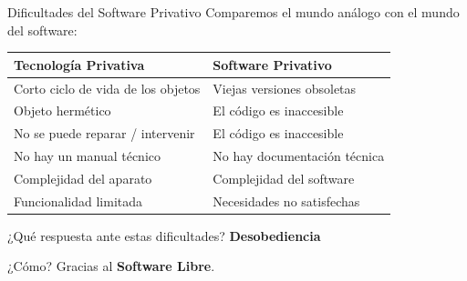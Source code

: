 \documentclass[spanish]{beamer}
\begin{document}
\begin{frame}{Dificultades del Software Privativo}
    \centering
    Comparemos el mundo análogo con el mundo del software:
    \vspace{0.6cm}

    \resizebox{11cm}{!}
    {
    \begin{tabular}{|l|l|}
        \hline        
        \rowcolor{lightgray}\textbf{Tecnología Privativa} & \textbf{Software Privativo} \\ 
        \hline
        \hline
        Corto ciclo de vida de los objetos & Viejas versiones obsoletas \\ 
        \hline
        Objeto hermético & El código es inaccesible \\
        \hline
        No se puede reparar / intervenir & El código es inaccesible \\
        \hline
        No hay un manual técnico & No hay documentación técnica \\
        \hline
        Complejidad del aparato & Complejidad del software \\
        \hline
        Funcionalidad limitada & Necesidades no satisfechas \\
        \hline
    \end{tabular}
    }
    
    \vspace{0.6cm}

    ¿Qué respuesta ante estas dificultades? \MVRightArrow{} \textbf{Desobediencia}
    
    ¿Cómo? Gracias al \textbf{Software Libre}.
\end{frame}
\end{document}
